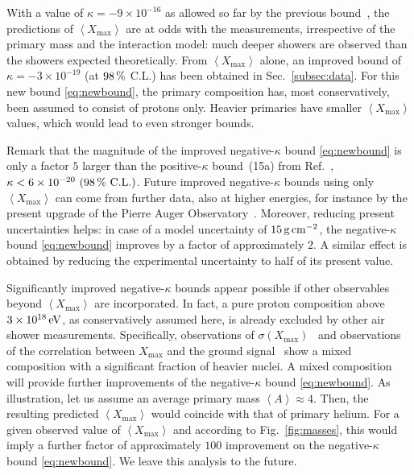 \documentclass[aps,prd,preprint,longbibliography]{revtex4-1}
\begin{document}
With a value of $\kappa = -9 \times 10^{-16}$
as allowed so far by the previous bound~\cite{KlinkhamerSchreck2008},
the predictions of $\left<X_\text{max}\right>$
are at odds with the measurements, irrespective of the primary mass and the interaction model:
much deeper showers
are observed than the showers expected theoretically.
From
$\left<X_\text{max}\right>$ alone, an improved bound of
$\kappa = -3 \times 10^{-19}$ (at $\unit[98]{\%}$ C.L.)
has been obtained in Sec.~\ref{subsec:data}.
For this new bound \eqref{eq:newbound},
the primary composition has, most conservatively,
been assumed
to consist of protons only. Heavier primaries have smaller
$\left<X_\text{max}\right>$ values, which would lead to even stronger bounds.

Remark that the magnitude of the improved
negative-$\kappa$ bound \eqref{eq:newbound}
is only a factor $5$ larger than the
positive-$\kappa$ bound~(15a) from Ref.~\cite{KlinkhamerSchreck2008},
$\kappa < 6 \times 10^{-20} ~  \text{($\unit[98]{\%}$ C.L.)}$.
Future improved negative-$\kappa$ bounds
using only $\left<X_\text{max}\right>$ can come
from further data, also at higher energies, for instance by the present upgrade of the Pierre Auger Observatory~\cite{Engel2015,Auger2015}.
Moreover,
reducing present uncertainties helps: in case of a model uncertainty of
$\unit[15]{g\,cm^{-2}}$, the negative-$\kappa$ bound \eqref{eq:newbound}
improves by a factor of approximately $2$.
A similar effect is obtained by reducing the experimental uncertainty
to half of its present value.

Significantly improved negative-$\kappa$ bounds
appear possible if other observables beyond
$\left<X_\text{max}\right>$ are incorporated.
In fact, a pure proton composition above $\unit[3\times10^{18}]{eV}$,
as conservatively assumed here,
is already excluded by other air shower measurements.
Specifically, observations of $\sigma(X_\text{max})$~\cite{Auger2014}
and observations of the correlation
between $X_\text{max}$ and the ground signal~\cite{Auger2016} show a mixed composition with a
significant fraction of heavier nuclei.
A mixed composition
will provide further improvements of
the negative-$\kappa$ bound \eqref{eq:newbound}.
As illustration, let us assume an
average primary mass  $\left<A\right> \approx 4$.
Then, the resulting predicted
$\left<X_\text{max}\right>$ would coincide with that of primary helium.
For a given observed value of $\left<X_\text{max}\right>$
and according to Fig.~\ref{fig:masses}, this would imply
a further factor of approximately $100$
improvement on the negative-$\kappa$ bound \eqref{eq:newbound}.
We leave this analysis to the future.
\end{document}

